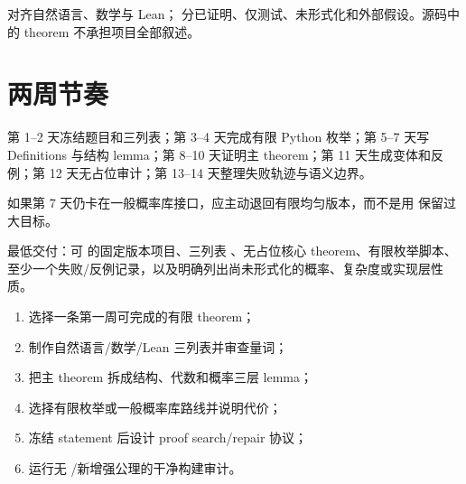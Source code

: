 对齐自然语言、数学与 Lean； 分已证明、仅测试、未形式化和外部假设。源码中的 theorem 不承担项目全部叙述。

\section{两周节奏}

第 1--2 天冻结题目和三列表；第 3--4 天完成有限 Python 枚举；第 5--7 天写 Definitions 与结构 lemma；第 8--10 天证明主 theorem；第 11 天生成变体和反例；第 12 天无占位审计；第 13--14 天整理失败轨迹与语义边界。

如果第 7 天仍卡在一般概率库接口，应主动退回有限均匀版本，而不是用  保留过大目标。

\begin{protocolbox}
最低交付：可  的固定版本项目、三列表 、无占位核心 theorem、有限枚举脚本、至少一个失败/反例记录，以及明确列出尚未形式化的概率、复杂度或实现层性质。
\end{protocolbox}

\begin{checkpointbox}
\begin{enumerate}
  \item 选择一条第一周可完成的有限 theorem；
  \item 制作自然语言/数学/Lean 三列表并审查量词；
  \item 把主 theorem 拆成结构、代数和概率三层 lemma；
  \item 选择有限枚举或一般概率库路线并说明代价；
  \item 冻结 statement 后设计 proof search/repair 协议；
  \item 运行无 /新增强公理的干净构建审计。
\end{enumerate}
\end{checkpointbox}
